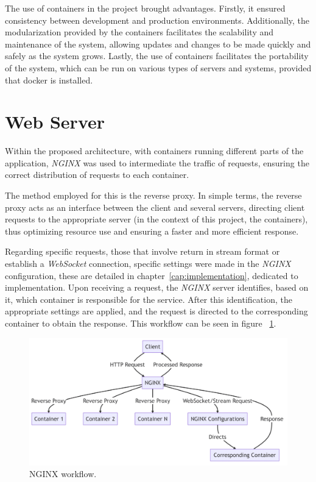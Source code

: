The use of containers in the project brought advantages. Firstly, it ensured consistency between development and production environments. Additionally, the modularization provided by the containers facilitates the scalability and maintenance of the system, allowing updates and changes to be made quickly and safely as the system grows. Lastly, the use of containers facilitates the portability of the system, which can be run on various types of servers and systems, provided that docker is installed.


\section{Web Server}\label{sec:webserver}

Within the proposed architecture, with containers running different parts of the application, \textit{NGINX} \cite{nginxDocs} was used to intermediate the traffic of requests, ensuring the correct distribution of requests to each container.

The method employed for this is the reverse proxy. In simple terms, the reverse proxy acts as an interface between the client and several servers, directing client requests to the appropriate server (in the context of this project, the containers), thus optimizing resource use and ensuring a faster and more efficient response.

Regarding specific requests, those that involve return in stream format or establish a \textit{WebSocket} connection, specific settings were made in the \textit{NGINX} configuration, these are detailed in chapter~\ref{cap:implementation}, dedicated to implementation. Upon receiving a request, the \textit{NGINX} server identifies, based on it, which container is responsible for the service. After this identification, the appropriate settings are applied, and the request is directed to the corresponding container to obtain the response. This workflow can be seen in figure ~\ref{fig:nginx_workflow}.

\begin{figure}[htbp]
	\centering
	\includegraphics[width=\textwidth]{images/diagrama_nginx.png}
	\caption{NGINX workflow.}
	\label{fig:nginx_workflow}
\end{figure}

